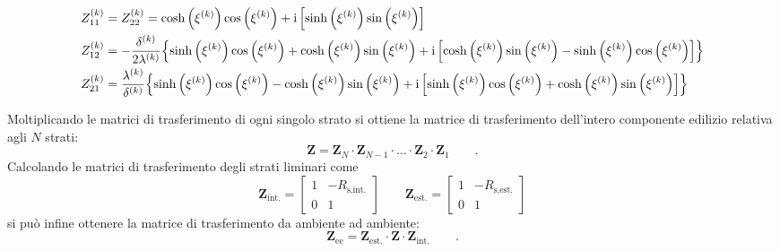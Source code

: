 {\footnotesize
\begin{align*}
    Z_{11}^{(k)} &= Z_{22}^{(k)} = \cosh\left(\xi^{(k)}\right)\cos\left(\xi^{(k)}\right) + \mathrm{i} \left[\sinh\left(\xi^{(k)}\right)\sin\left(\xi^{(k)}\right)\right] \\
    Z_{12}^{(k)} &=-\frac{\delta^{(k)}}{2\lambda^{(k)}}\Bigl\{\sinh\left(\xi^{(k)}\right)\cos\left(\xi^{(k)}\right)+\cosh\left(\xi^{(k)}\right)\sin\left(\xi^{(k)}\right) + \mathrm{i}\left[\cosh\left(\xi^{(k)}\right)\sin\left(\xi^{(k)}\right)-\sinh\left(\xi^{(k)}\right)\cos\left(\xi^{(k)}\right)\right]  \Bigr\} \\
    Z_{21}^{(k)} &= \frac{\lambda^{(k)}}{\delta^{(k)}}\Bigl\{  \sinh\left(\xi^{(k)}\right)\cos\left(\xi^{(k)}\right)-\cosh\left(\xi^{(k)}\right)\sin\left(\xi^{(k)}\right) + \mathrm{i} \left[\sinh\left(\xi^{(k)}\right)\cos\left(\xi^{(k)}\right)+\cosh\left(\xi^{(k)}\right)\sin\left(\xi^{(k)}\right)\right] \Bigr\}
\end{align*}
}

Moltiplicando le matrici di trasferimento di ogni singolo strato si ottiene la matrice di trasferimento dell'intero componente edilizio relativa agli $N$  strati:
\begin{equation}
    \mathbf{Z}=\mathbf{Z}_{N}\cdot\mathbf{Z}_{N-1}\cdot\ldots\cdot\mathbf{Z}_{2}\cdot\mathbf{Z}_{1} \qquad .
\end{equation}
Calcolando le matrici di trasferimento degli strati liminari come
\begin{equation}
    \mathbf{Z}_{\text{int.}} = 
    \begin{bmatrix}
        1 & -R_{\text{s,int.}} \\
        0 & 1
    \end{bmatrix}
    \qquad
    \mathbf{Z}_{\text{est.}} = 
    \begin{bmatrix}
        1 & -R_{\text{s,est.}} \\
        0 & 1
    \end{bmatrix}
\end{equation}
si può infine ottenere la matrice di trasferimento da ambiente ad ambiente:
\begin{equation}
    \mathbf{Z}_{\text{ee}} = \mathbf{Z}_{\text{est.}} \cdot \mathbf{Z} \cdot \mathbf{Z}_{\text{int.}} \qquad .
\end{equation}

